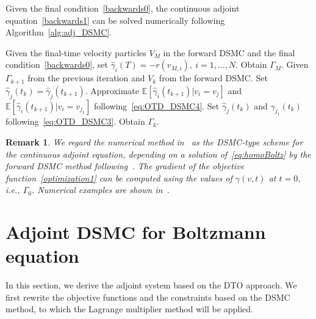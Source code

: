 \documentclass[times,final,nopreprintline]{elsarticle}
\newtheorem{remark}{Remark}
\begin{document}
Given the final condition~\eqref{backwards0}, the continuous adjoint equation~\eqref{backwards1} can be solved numerically following Algorithm~\ref{alg:adj_DSMC}.
\begin{algorithm}[ht!]
  \caption{Algorithm for solving the continuous adjoint equation~\eqref{eq:backwards}\label{alg:adj_DSMC}}
\begin{algorithmic}[1]
\State Given the final-time velocity particles $V_{M}$ in the forward DSMC and the final condition~\eqref{backwards0}, set $\hat \gamma_i(T) = -r(v_{M,i}),\ i =1,\dots,N.$ Obtain $\Gamma_M$.
\State Given $\Gamma_{k+1}$ from the previous iteration and $V_{k}$ from the forward DSMC.
\State Set $\hat \gamma_j(t_{k}) = \hat \gamma_j(t_{k+1})$.
\State Approximate $\mathbb E[\hat \gamma_i (t_{k+1}) |v_i = v_j]$ and $\mathbb E[\hat \gamma_i (t_{k+1}) |v_i= v_{j_1}]$ following~\eqref{eq:OTD_DSMC4}.
\State Set $\hat \gamma_j(t_k)$ and $\hat \gamma_{j_1}(t_k)$ following~\eqref{eq:OTD_DSMC3}. 
\EndIf
\State Obtain $\Gamma_k$.
\EndFor
\end{algorithmic}
\end{algorithm}
\begin{remark}
We regard the numerical method in~ as the DSMC-type scheme for the continuous adjoint equation,
depending on a solution of~\eqref{eq:homoBoltz}  by the forward DSMC method following~. 
The gradient of the objective function~\eqref{optimization1} can be computed using the values  of $\gamma(v,t)$ at $t=0$, i.e., $\Gamma_0$. Numerical examples are shown in~.
\end{remark}









\section{Adjoint DSMC for Boltzmann equation} \label{DiscreteFormulation}
In this section, we derive the adjoint system based on the DTO approach. We first rewrite the objective functions and the constraints based on the DSMC method, to which the Lagrange multiplier method will be applied.
\end{document}
